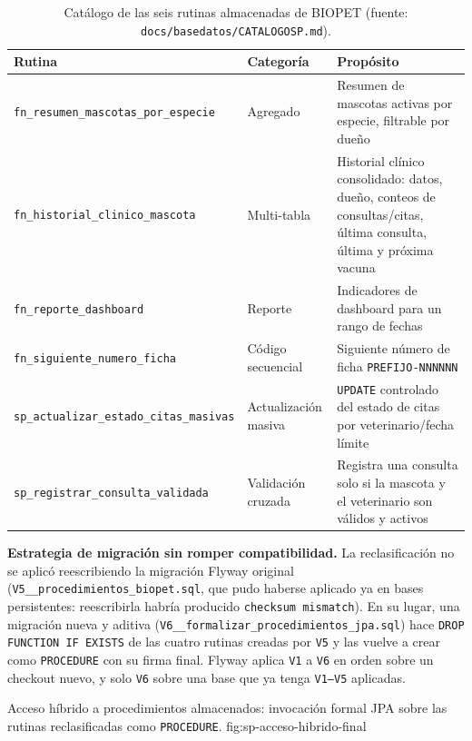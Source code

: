 \begin{table}[H]
  \centering
  \small
  \caption{Cat\'alogo de las seis rutinas almacenadas de BIOPET (fuente: \texttt{docs/basedatos/CATALOGOSP.md}).}
  \label{tab:catalogo-sp}
  \begin{tabular}{@{}p{4.0cm}p{2.2cm}p{6.6cm}@{}}
    \toprule
    Rutina & Categor\'ia & Prop\'osito \\
    \midrule
    \texttt{fn\_resumen\_mascotas\_por\_especie} & Agregado & Resumen de mascotas activas por especie, filtrable por due\~no \\
    \texttt{fn\_historial\_clinico\_mascota} & Multi-tabla & Historial cl\'inico consolidado: datos, due\~no, conteos de consultas/citas, \'ultima consulta, \'ultima y pr\'oxima vacuna \\
    \texttt{fn\_reporte\_dashboard} & Reporte & Indicadores de dashboard para un rango de fechas \\
    \texttt{fn\_siguiente\_numero\_ficha} & C\'odigo secuencial & Siguiente n\'umero de ficha \texttt{PREFIJO-NNNNNN} \\
    \texttt{sp\_actualizar\_estado\_citas\_masivas} & Actualizaci\'on masiva & \texttt{UPDATE} controlado del estado de citas por veterinario/fecha l\'imite \\
    \texttt{sp\_registrar\_consulta\_validada} & Validaci\'on cruzada & Registra una consulta solo si la mascota y el veterinario son v\'alidos y activos \\
    \bottomrule
  \end{tabular}
\end{table}

\textbf{Estrategia de migraci\'on sin romper compatibilidad.} La
reclasificaci\'on no se aplic\'o reescribiendo la migraci\'on Flyway
original (\texttt{V5\_\_procedimientos\_biopet.sql}, que pudo haberse
aplicado ya en bases persistentes: reescribirla habr\'ia producido
\texttt{checksum mismatch}). En su lugar, una migraci\'on nueva y aditiva
(\texttt{V6\_\_formalizar\_procedimientos\_jpa.sql}) hace \texttt{DROP
FUNCTION IF EXISTS} de las cuatro rutinas creadas por \texttt{V5} y las
vuelve a crear como \texttt{PROCEDURE} con su firma final. Flyway aplica
\texttt{V1} a \texttt{V6} en orden sobre un checkout nuevo, y solo
\texttt{V6} sobre una base que ya tenga \texttt{V1--V5} aplicadas.

%
{Acceso h\'ibrido a procedimientos almacenados: invocaci\'on formal JPA sobre las rutinas reclasificadas como \texttt{PROCEDURE}.}%
{fig:sp-acceso-hibrido-final}

